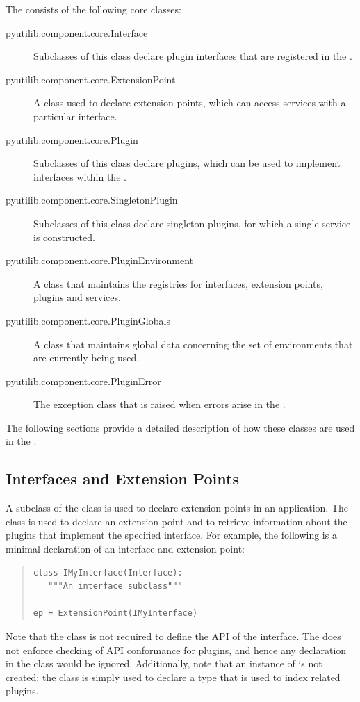 The \pcasp consists of the following core classes:
\begin{description}
\item[pyutilib.component.core.Interface] Subclasses of this class declare plugin interfaces that are registered in the \pca. 
\item[pyutilib.component.core.ExtensionPoint] A class used to declare extension points, which can access services with a particular interface.
\item[pyutilib.component.core.Plugin] Subclasses of this class declare plugins, which can be used to implement interfaces within the \pca. 
\item[pyutilib.component.core.SingletonPlugin] Subclasses of this class declare singleton plugins, for which a single service is constructed. 
\item[pyutilib.component.core.PluginEnvironment] A class that maintains the registries for interfaces, extension points, plugins and services. 
\item[pyutilib.component.core.PluginGlobals] A class that maintains global data concerning the set of environments that are currently being used. 
\item[pyutilib.component.core.PluginError] The exception class that is raised when errors arise in the \pca. 
\end{description}
The following sections provide a detailed description of how these classes are used in the
\pca.

\subsection{Interfaces and Extension Points}

A subclass of the  class is used to declare extension
points in an application. The  class is used to
declare an extension point and to retrieve information about the plugins
that implement the specified interface. For example, the following is
a minimal declaration of an interface and extension point:
\begin{quotation}
\begin{lstlisting}
class IMyInterface(Interface):
   """An interface subclass"""

ep = ExtensionPoint(IMyInterface)
\end{lstlisting}
\end{quotation}
Note that the  class is not required to define the API
of the interface. The \pcasp does not enforce checking of API conformance
for plugins, and hence any declaration in the 
class would be ignored. Additionally, note that an instance of
 is not created; the  class is simply
used to declare a type that is used to index related plugins.

